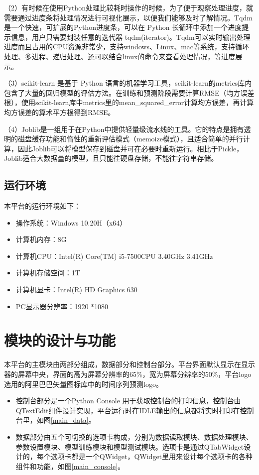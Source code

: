 \documentclass[cn,11pt,chinese]{elegantbook}
\begin{document}
（2）有时候在使用Python处理比较耗时操作的时候，为了便于观察处理进度，就需要通过进度条将处理情况进行可视化展示，以便我们能够及时了解情况。Tqdm是一个快速，可扩展的Python进度条，可以在 Python 长循环中添加一个进度提示信息，用户只需要封装任意的迭代器 tqdm(iterator)。Tqdm可以实时输出处理进度而且占用的CPU资源非常少，支持windows、Linux、mac等系统，支持循环处理、多进程、递归处理、还可以结合linux的命令来查看处理情况，等进度展示。

（3）scikit-learn 是基于 Python 语言的机器学习工具，scikit-learn的metrics库内包含了大量的回归模型的评估方法。在训练和预测阶段需要计算RMSE（均方误差根），使用scikit-learn库中metrics里的mean\_squared\_error计算均方误差，再计算均方误差的算术平方根得到RMSE。

（4）Joblib是一组用于在Python中提供轻量级流水线的工具。它的特点是拥有透明的磁盘缓存功能和惰性的重新评估模式（memoize模式），且适合简单的并行计算，因此Joblib可以将模型保存到磁盘并可在必要时重新运行。相比于Pickle，Joblib适合大数据量的模型，且只能往硬盘存储，不能往字符串存储。


\section{运行环境}

本平台的运行环境如下：

\begin{itemize}
	\item 操作系统：Windows 10.20H（x64）
	\item 计算机内存：8G
	\item 计算机CPU：Intel(R) Core(TM) i5-7500CPU 3.40GHz 3.41GHz
	\item 计算机存储空间：1T
	\item 计算机显卡：Intel(R) HD Graphics 630
	\item PC显示器分辨率：1920 *1080
\end{itemize}

\chapter{模块的设计与功能}

本平台的主模块由两部分组成，数据部分和控制台部分。平台界面默认显示在显示器的屏幕中央，界面的高为屏幕分辨率的65\%，宽为屏幕分辨率的50\%，平台logo选用的阿里巴巴矢量图标库中的时间序列预测logo。

\begin{itemize}
	\item 控制台部分是一个Python Console 用于获取控制台的打印信息，控制台由QTextEdit组件设计实现，平台运行时在IDLE输出的信息都将实时打印在控制台里，如图\ref{main_data}。
	
	\item 数据部分由五个可切换的选项卡构成，分别为数据读取模块、数据处理模块、参数设置模块、模型训练模块和模型测试模块。选项卡是通过QTabWidget设计的，每个选项卡都是一个QWidget，QWidget里用来设计每个选项卡的各种组件和功能，如图\ref{main_console}。
\end{itemize}
\end{document}
